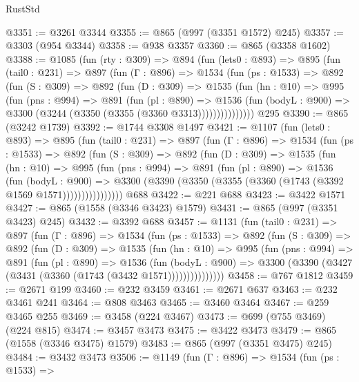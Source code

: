 \begin{lexlean}{RustStd}
\begin{coremodule}
@3351 := @3261 @3344
@3355 := @865 (@997 (@3351 @1572) @245)
@3357 := @3303 (@954 @3344)
@3358 := @938 @3357
@3360 := @865 (@3358 @1602)
@3388 := @1085
    (fun (rty : @309) =>
    @894
      (fun (lets0 : @893) =>
      @895
        (fun (tail0 : @231) =>
        @897
          (fun (Γ : @896) =>
          @1534
            (fun (ps : @1533) =>
            @892
              (fun (S : @309) =>
              @892
                (fun (D : @309) =>
                @1535
                  (fun (hn : @10) =>
                  @995
                    (fun (pns : @994) =>
                    @891
                      (fun (pl : @890) =>
                      @1536
                        (fun (bodyL : @900) =>
                        @3300 (@3244 (@3350 (@3355 (@3360 @3313)))))))))))))))
    @295
@3390 := @865 (@3242 @1739)
@3392 := @1744 @3308 @1497
@3421 := @1107
    (fun (lets0 : @893) =>
    @895
      (fun (tail0 : @231) =>
      @897
        (fun (Γ : @896) =>
        @1534
          (fun (ps : @1533) =>
          @892
            (fun (S : @309) =>
            @892
              (fun (D : @309) =>
              @1535
                (fun (hn : @10) =>
                @995
                  (fun (pns : @994) =>
                  @891
                    (fun (pl : @890) =>
                    @1536
                      (fun (bodyL : @900) =>
                      @3300 (@3390 (@3350 (@3355 (@3360 (@1743 (@3392 @1569 @1571))))))))))))))))
    @688
@3422 := @221 @688
@3423 := @3422 @1571
@3427 := @865 (@1558 (@3346 @3423) @1579)
@3431 := @865 (@997 (@3351 @3423) @245)
@3432 := @3392 @688
@3457 := @1131
    (fun (tail0 : @231) =>
    @897
      (fun (Γ : @896) =>
      @1534
        (fun (ps : @1533) =>
        @892
          (fun (S : @309) =>
          @892
            (fun (D : @309) =>
            @1535
              (fun (hn : @10) =>
              @995
                (fun (pns : @994) =>
                @891
                  (fun (pl : @890) =>
                  @1536
                    (fun (bodyL : @900) =>
                    @3300 (@3390 (@3427 (@3431 (@3360 (@1743 (@3432 @1571)))))))))))))))
@3458 := @767 @1812
@3459 := @2671 @199
@3460 := @232 @3459
@3461 := @2671 @637
@3463 := @232 @3461 @241
@3464 := @808 @3463
@3465 := @3460 @3464
@3467 := @259 @3465 @255
@3469 := @3458 (@224 @3467)
@3473 := @699 (@755 @3469) (@224 @815)
@3474 := @3457 @3473
@3475 := @3422 @3473
@3479 := @865 (@1558 (@3346 @3475) @1579)
@3483 := @865 (@997 (@3351 @3475) @245)
@3484 := @3432 @3473
@3506 := @1149
    (fun (Γ : @896) =>
    @1534
      (fun (ps : @1533) =>

\end{coremodule}
\end{lexlean}
